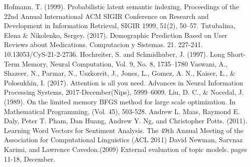 \documentclass[uplatex]{jsarticle}
\begin{document}
\begin{thebibliography}{数字}
     Hofmann, T. (1999). Probabilistic latent semantic indexing. Proceedings of the 22nd Annual International ACM SIGIR Conference on Research and Development in Information Retrieval, SIGIR 1999, 51(2), 50–57.
     Tutubalina, Elena \& Nikolenko, Sergey. (2017). Demographic Prediction Based on User Reviews about Medications. Computacion y Sistemas. 21. 227-241. 10.13053/CyS-21-2-2736.
     Hochreiter, S. and Schmidhuber, J. (1997). Long Short-Term Memory, Neural Computation, Vol. 9, No. 8, 1735–1780
     Vaswani, A., Shazeer, N., Parmar, N., Uszkoreit, J., Jones, L., Gomez, A. N., Kaiser, Ł., \& Polosukhin, I. (2017). Attention is all you need. Advances in Neural Information Processing Systems, 2017-December(Nips), 5999–6009.
     Liu, D. C., \& Nocedal, J. (1989). On the limited memory BFGS method for large scale optimization. In Mathematical Programming, (Vol. 45), 503-528.
     Andrew L. Maas, Raymond E. Daly, Peter T. Pham, Dan Huang, Andrew Y. Ng, and Christopher Potts. (2011). Learning Word Vectors for Sentiment Analysis. The 49th Annual Meeting of the Association for Computational Linguistics (ACL 2011)
     David Newman, Sarvnaz Karimi, and Lawrence Cavedon.(2009) External evaluation of topic models. pages 11-18, December.
\end{thebibliography}
\end{document}
